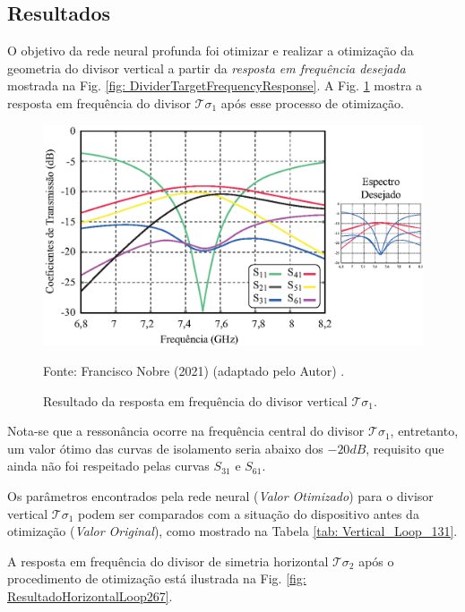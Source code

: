 \subsection{Resultados}      \label{Resultado DivPot}

O objetivo da rede neural profunda foi otimizar e realizar a otimização da geometria do divisor vertical a partir da \textit{resposta em frequência desejada} mostrada na Fig. \ref{fig: DividerTargetFrequencyResponse}. A Fig. \ref{fig: ResultadoVerticalLoop131} mostra a resposta em frequência do divisor $\mathcal{T}\sigma_{1}$ após esse processo de otimização.

\begin{figure}[H]
	\centering\includegraphics{04-Figuras/ResultadoVerticalLoop131.eps}
	\caption{Resultado da resposta em frequência do divisor vertical $\mathcal{T}\sigma_{1}$.}
    Fonte: Francisco Nobre (2021) (adaptado pelo Autor) \cite{Nobre2021Graphene}.
	\label{fig: ResultadoVerticalLoop131}
\end{figure}

Nota-se que a ressonância ocorre na frequência central do divisor $\mathcal{T}\sigma_{1}$, entretanto, um valor ótimo das curvas de isolamento seria abaixo dos $-20dB$, requisito que ainda não foi respeitado pelas curvas $S_{31}$ e $S_{61}$.

Os parâmetros encontrados pela rede neural (\textit{Valor Otimizado}) para o divisor vertical $\mathcal{T}\sigma_{1}$ podem ser comparados com a situação do dispositivo antes da otimização (\textit{Valor Original}), como mostrado na Tabela \ref{tab: Vertical_Loop_131}.



A resposta em frequência do divisor de simetria horizontal $\mathcal{T}\sigma_{2}$ após o procedimento de otimização está ilustrada na Fig. \ref{fig: ResultadoHorizontalLoop267}.

